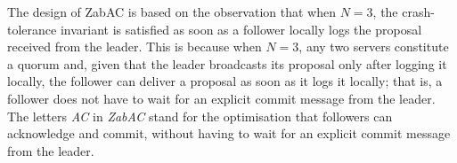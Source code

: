 \documentclass[a4paper,UKenglish]{oasics-v2016}
\begin{document}
The design of ZabAC is based on the observation that when $N=3$, the crash-tolerance invariant is satisfied as soon as a follower locally logs the proposal received from the leader. This is because when $N=3$, any two servers constitute a quorum and, given that the leader broadcasts its proposal only after logging it locally, the follower can deliver a proposal as soon as it logs it locally; that is, a follower does not have to wait for an explicit commit message from the leader. The letters \emph{AC} in \emph{ZabAC} stand for the optimisation that followers can acknowledge and commit, without having to wait for an explicit commit message from the leader.







\end{document}
